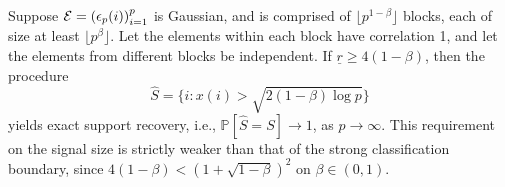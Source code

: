 \begin{example} \label{exmp:counter-example}
Suppose ${\cal E} = \left(\epsilon_p(i)\right)_{i=1}^p$ is Gaussian, and is comprised of $\lfloor p^{1-\beta}\rfloor$ blocks, each of size at least $\lfloor p^\beta \rfloor$.  Let the elements within each block have correlation 1, and let the elements from different blocks be independent. 
If $\underline{r} \ge 4(1-\beta)$, then the procedure 
$$
 \widehat{S} = \big\{i:x(i)>\sqrt{2(1-\beta)\log{p}}\big\}
 $$ 
yields exact support recovery, i.e., $\mathbb P[\widehat{S} = S] \to 1$, as $p\to\infty$.  This requirement on the signal size is strictly 
weaker than that of the strong classification boundary, since $4(1-\beta) < (1 + \sqrt{1-\beta})^2$ on $\beta\in(0,1)$.
\end{example} 
